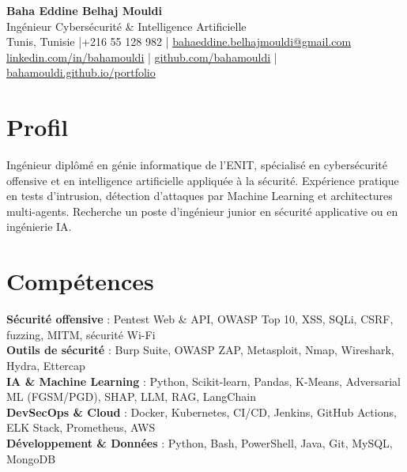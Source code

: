\documentclass[a4paper,10pt]{article}
\begin{document}
\begin{center}
  {\LARGE\bfseries\color{navy} Baha Eddine Belhaj Mouldi}\\[4pt]
  {\large Ingénieur Cybersécurité \& Intelligence Artificielle}\\[6pt]
  \normalsize
  Tunis, Tunisie \quad|\quad +216 55 128 982 \quad|\quad
  \href{mailto:bahaeddine.belhajmouldi@gmail.com}{bahaeddine.belhajmouldi@gmail.com}\\[2pt]
  \href{https://www.linkedin.com/in/bahamouldi}{linkedin.com/in/bahamouldi} \quad|\quad
  \href{https://github.com/bahamouldi}{github.com/bahamouldi} \quad|\quad
  \href{https://bahamouldi.github.io/portfolio/}{bahamouldi.github.io/portfolio}
\end{center}
\vspace{4pt}

\section{Profil}
Ingénieur diplômé en génie informatique de l'ENIT, spécialisé en cybersécurité offensive et en intelligence artificielle appliquée à la sécurité. Expérience pratique en tests d'intrusion, détection d'attaques par Machine Learning et architectures multi-agents. Recherche un poste d'ingénieur junior en sécurité applicative ou en ingénierie IA.

\section{Compétences}
\textbf{Sécurité offensive} : Pentest Web \& API, OWASP Top 10, XSS, SQLi, CSRF, fuzzing, MITM, sécurité Wi-Fi\\[2pt]
\textbf{Outils de sécurité} : Burp Suite, OWASP ZAP, Metasploit, Nmap, Wireshark, Hydra, Ettercap\\[2pt]
\textbf{IA \& Machine Learning} : Python, Scikit-learn, Pandas, K-Means, Adversarial ML (FGSM/PGD), SHAP, LLM, RAG, LangChain\\[2pt]
\textbf{DevSecOps \& Cloud} : Docker, Kubernetes, CI/CD, Jenkins, GitHub Actions, ELK Stack, Prometheus, AWS\\[2pt]
\textbf{Développement \& Données} : Python, Bash, PowerShell, Java, Git, MySQL, MongoDB
\end{document}
